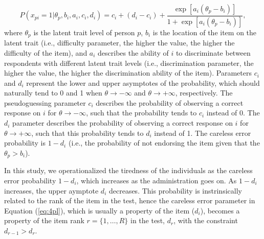 \documentclass{svproc}
\begin{document}
\begin{equation}\label{eq:4pl}
	P(x_{pi}= 1| \theta_p, b_i, a_i, c_i, d_i) = c_i + (d_i -c_i) + \dfrac{\exp[a_i(\theta_p - b_i)]}{1 + \exp[a_i(\theta_p - b_i)]},
\end{equation}
where $\theta_p$ is the latent trait level of person $p$, $b_i$ is the location of the item on the latent trait (i.e., difficulty parameter, the higher the value, the higher the difficulty of the item), and $a_i$ describes the ability of $i$ to discriminate between respondents with different latent trait levels (i.e., discrimination parameter, the higher the value, the higher the discrimination ability of the item). Parameters $c_i$ and $d_i$ represent the lower and upper asymptotes of the probability, which should naturally tend to 0 and 1 when $\theta \to - \infty$ and $\theta \to +\infty$, respectively. 
The pseudoguessing parameter $c_i$ describes the probability of observing a correct response on $i$ for $\theta \to - \infty$, such that the probability tends to $c_i$ instead of 0. 
The $d_i$ parameter describes the probability of observing a correct response on $i$ for $\theta \to + \infty$, such that this probability tends to $d_i$ instead of 1. The careless error probability is $1 - d_i$ (i.e., the probability of not endorsing the item given that the $\theta_p > b_i$).


\color{blue}
In this study, we operationalized the tiredness of the individuals as the careless error probability $1 - d_i$, which increases as the administration goes on. As $1 - d_i$ increases, the upper aymptote $d_i$ decreases.
This probability is instrinsically related to the rank of the item in the test, hence the careless error parameter in Equation (\ref{eq:4pl}), which is usually a property of the item ($d_i$), becomes a property of the item rank $r = \{1, \ldots, R\}$ in the test, $d_r$, with the constraint $d_{r-1} > d_r$.
\normalcolor
\end{document}
